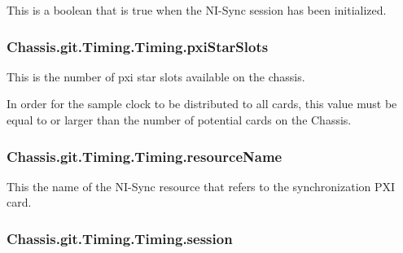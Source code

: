 This is a boolean that is true when the N\-I-\/\-Sync session has been initialized. 

\hypertarget{class_chassis_8git_1_1_timing_1_1_timing_ab50b63f49e67b9dfc14cdcdc9b562a51}{
\subsubsection[{pxi\-Star\-Slots}]{\setlength{\rightskip}{0pt plus 5cm}Chassis.\-git.\-Timing.\-Timing.\-pxi\-Star\-Slots}}\label{class_chassis_8git_1_1_timing_1_1_timing_ab50b63f49e67b9dfc14cdcdc9b562a51}


This is the number of pxi star slots available on the chassis. 

In order for the sample clock to be distributed to all cards, this value must be equal to or larger than the number of potential cards on the Chassis. \hypertarget{class_chassis_8git_1_1_timing_1_1_timing_a3357175a0fe511b96437a0fd8baf3fc4}{
\subsubsection[{resource\-Name}]{\setlength{\rightskip}{0pt plus 5cm}Chassis.\-git.\-Timing.\-Timing.\-resource\-Name}}\label{class_chassis_8git_1_1_timing_1_1_timing_a3357175a0fe511b96437a0fd8baf3fc4}


This the name of the N\-I-\/\-Sync resource that refers to the synchronization P\-X\-I card. 

\hypertarget{class_chassis_8git_1_1_timing_1_1_timing_a8bce703953eed1bd9c9cfd33a28515a2}{
\subsubsection[{session}]{\setlength{\rightskip}{0pt plus 5cm}Chassis.\-git.\-Timing.\-Timing.\-session}}\label{class_chassis_8git_1_1_timing_1_1_timing_a8bce703953eed1bd9c9cfd33a28515a2}


